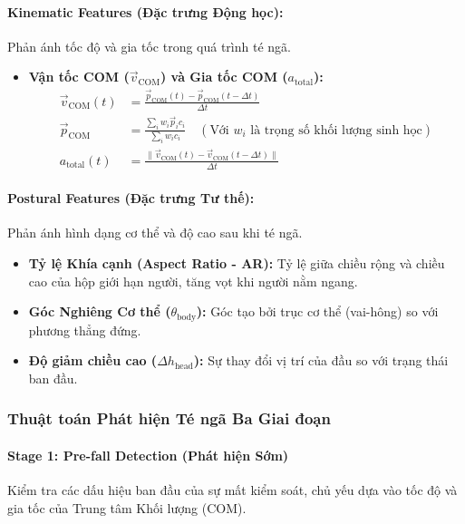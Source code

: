 \paragraph{Kinematic Features (Đặc trưng Động học):} Phản ánh tốc độ và gia tốc trong quá trình té ngã.
\begin{itemize}
    \item \textbf{Vận tốc COM ($\vec{v}_{\text{COM}}$) và Gia tốc COM ($a_{\text{total}}$):}
    \begin{align}
    \vec{v}_{\text{COM}}(t) &= \frac{\vec{p}_{\text{COM}}(t) - \vec{p}_{\text{COM}}(t-\Delta t)}{\Delta t} \\
    \vec{p}_{\text{COM}} &= \frac{\sum_i w_i \vec{p}_i c_i}{\sum_i w_i c_i} \quad (\text{Với } w_i \text{ là trọng số khối lượng sinh học}) \\
    a_{\text{total}}(t) &= \frac{\|\vec{v}_{\text{COM}}(t) - \vec{v}_{\text{COM}}(t-\Delta t)\|}{\Delta t}
    \end{align}
\end{itemize}

\paragraph{Postural Features (Đặc trưng Tư thế):} Phản ánh hình dạng cơ thể và độ cao sau khi té ngã.
\begin{itemize}
    \item \textbf{Tỷ lệ Khía cạnh (Aspect Ratio - AR):} Tỷ lệ giữa chiều rộng và chiều cao của hộp giới hạn người, tăng vọt khi người nằm ngang.
    \item \textbf{Góc Nghiêng Cơ thể ($\theta_{\text{body}}$):} Góc tạo bởi trục cơ thể (vai-hông) so với phương thẳng đứng.
    \item \textbf{Độ giảm chiều cao ($\Delta h_{\text{head}}$):} Sự thay đổi vị trí của đầu so với trạng thái ban đầu.
\end{itemize}

\subsubsection{Thuật toán Phát hiện Té ngã Ba Giai đoạn}

\paragraph{Stage 1: Pre-fall Detection (Phát hiện Sớm)}
Kiểm tra các dấu hiệu ban đầu của sự mất kiểm soát, chủ yếu dựa vào tốc độ và gia tốc của Trung tâm Khối lượng (COM).

